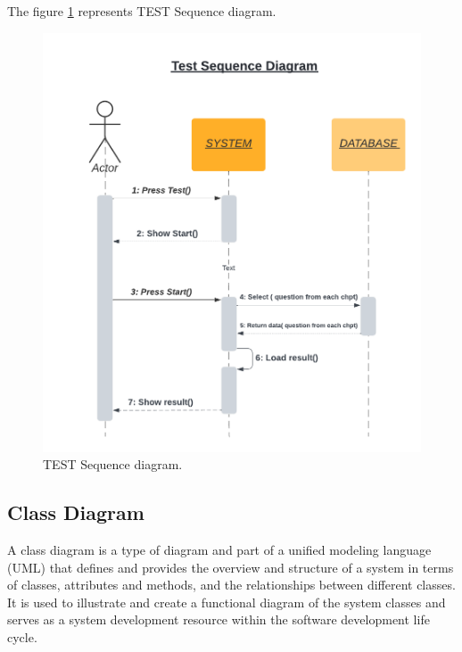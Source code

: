 \newpage
The figure \ref{fig:TEST DS} represents TEST Sequence diagram.
\begin{figure}[ht]
	\centering
	\label{}\includegraphics[scale=0.7]{img/Test Sequence diagram.pdf}                
	\caption{TEST Sequence diagram.} 
	\label{fig:TEST DS}
\end{figure} 




\subsection{Class Diagram}
A class diagram is a type of diagram and part of a unified modeling language (UML) that defines and provides the overview and structure of a system in terms of classes, attributes and methods, and the relationships between different classes. \cite{Techopedia-DC} \\
It is used to illustrate and create a functional diagram of the system classes and serves as a system development resource within the software development life cycle. \cite{Techopedia-DC} \\
\newpage

